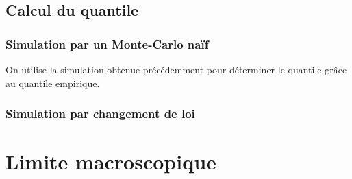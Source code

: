 \documentclass[a4paper,11pt]{article}
\begin{document}
\subsection{Calcul du quantile}

\subsubsection{Simulation par un Monte-Carlo naïf}
On utilise la simulation obtenue précédemment pour déterminer le quantile grâce au quantile empirique.

\subsubsection{Simulation par changement de loi}

\section{Limite macroscopique}
\end{document}
